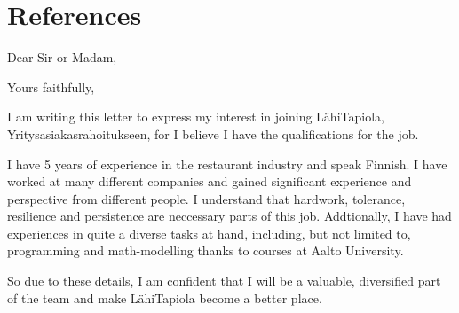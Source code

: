 \documentclass[11pt,a4paper,sans]{moderncv}
\begin{document}
  \section{References}
  \begin{cvcolumns}
  \end{cvcolumns}

  \clearpage
  \date{May 8, 2020}
  \opening{Dear Sir or Madam,}
  \closing{Yours faithfully,}
  \makelettertitle

  I am writing this letter to express my interest in joining LähiTapiola,
  Yritysasiakasrahoitukseen, for
  I believe I have the qualifications for the job.

  I have 5 years of experience in the restaurant industry and speak Finnish.
  I have worked at many different companies and gained significant experience and perspective
  from different people. I understand that hardwork, tolerance, resilience and persistence
  are neccessary parts of this job. Addtionally, I have had experiences in quite
  a diverse tasks at hand, including, but not limited to, programming and math-modelling
  thanks to courses at Aalto University.

  So due to these details, I am confident that I will be a valuable, diversified
  part of the team and make LähiTapiola become a better place.

  \makeletterclosing
\end{document}
